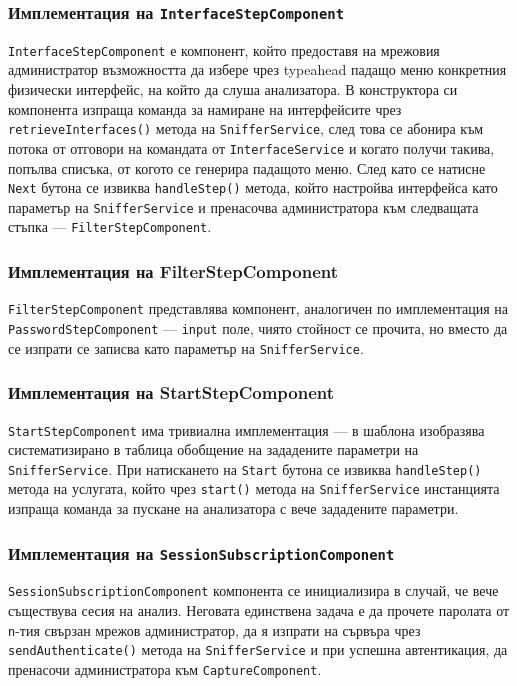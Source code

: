 \documentclass[12pt,a4paper,oneside]{book}
\begin{document}
\subsubsection{Имплементация на \texttt{InterfaceStepComponent}}

\texttt{InterfaceStepComponent} е компонент, който предоставя на мрежовия
администратор възможността да избере чрез typeahead падащо меню конкретния
физически интерфейс, на който да слуша анализатора. В конструктора си компонента
изпраща команда за намиране на интерфейсите чрез \texttt{retrieveInterfaces()}
метода на \texttt{SnifferService}, след това се абонира към потока от отговори на
командата от \texttt{InterfaceService} и когато получи такива, попълва списъка,
от когото се генерира падащото меню. След като се натисне \texttt{Next} бутона
се извиква \texttt{handleStep()} метода, който настройва интерфейса като
параметър на \texttt{SnifferService} и пренасочва администратора към следващата
стъпка --- \texttt{FilterStepComponent}.

\subsubsection{Имплементация на FilterStepComponent}

\texttt{FilterStepComponent} представлява компонент, аналогичен по имплементация на
\texttt{PasswordStepComponent} --- \texttt{input} поле, чиято стойност се
прочита, но вместо да се изпрати се записва като параметър на \texttt{SnifferService}.

\subsubsection{Имплементация на StartStepComponent}

\texttt{StartStepComponent} има тривиална имплементация ---
в шаблона изобразява
систематизирано в таблица обобщение на зададените параметри на
\texttt{SnifferService}. При натискането на \texttt{Start} бутона се извиква
\texttt{handleStep()} метода на услугата, който чрез \texttt{start()}
метода на \texttt{SnifferService} инстанцията изпраща команда за пускане
на анализатора с вече зададените параметри.

\subsubsection{Имплементация на \texttt{SessionSubscriptionComponent}}

\texttt{SessionSubscriptionComponent} компонента се инициализира в случай, че
вече съществува сесия на анализ. Неговата единствена задача е да прочете
паролата от \texttt{n}-тия свързан мрежов администратор, да я изпрати на сървъра
чрез \texttt{sendAuthenticate()} метода на \texttt{SnifferService} и при успешна
автентикация, да пренасочи администратора към \texttt{CaptureComponent}.
\end{document}
